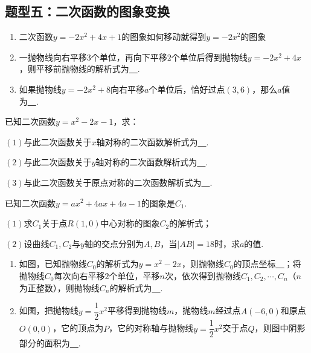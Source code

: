 \documentclass[10pt]{ctexart}
\newcommand{\abs}[1]{\left| #1 \right|}
\begin{document}
\subsection{题型五：二次函数的图象变换}
\begin{dkyi}{}{}
  \begin{enumerate}[(1)]
  \item 二次函数$y=-2x^2+4x+1$的图象如何移动就得到$y=-2x^2$的图象
  
  \item 一抛物线向右平移$3$个单位，再向下平移$2$个单位后得到抛物线$y=-2x^2+4x$，则平移前抛物线的解析式为\underline{~\hspace{1cm}~}.
  \item 如果抛物线$y=-2x^2+8$向右平移$a$个单位后，恰好过点$(3,6)$，那么$a$值为\underline{~\hspace{1cm}~}.
  \end{enumerate}
\end{dkyi}
\begin{dkyi}{}{}
已知二次函数$y=x^2-2x-1$，求：

$(1)$与此二次函数关于$x$轴对称的二次函数解析式为\underline{~\hspace{1cm}~}.

$(2)$与此二次函数关于$y$轴对称的二次函数解析式为\underline{~\hspace{1cm}~}.

$(3)$与此二次函数关于原点对称的二次函数解析式为\underline{~\hspace{1cm}~}.
\end{dkyi}
\begin{dkyi}{}{}
 已知二次函数$y=ax^2+4ax+4a-1$的图象是$C_1$.
 
 $(1)$求$C_1$关于点$R(1,0)$中心对称的图象$C_2$的解析式；
 
 $(2)$设曲线$C_1,C_2$与$y$轴的交点分别为$A,B$，当$\abs{AB}=18$时，求$a$的值.
\end{dkyi}
\begin{jply}{}{}
   \begin{enumerate}[(1)]
   \item 如图，已知抛物线$C_0$的解析式为$y=x^2-2x$，则抛物线$C_0$的顶点坐标\underline{~\hspace{1cm}~}；将抛物线$C_0$每次向右平移$2$个单位，平移$n$次，依次得到抛物线$C_1,C_2,\cdots,C_n$（$n$为正整数），则抛物线$C_n$的解析式为\underline{~\hspace{1cm}~}.
   \item 如图，把抛物线$y=\dfrac{1}{2}x^2$平移得到抛物线$m$，抛物线$m$经过点$A(-6,0)$和原点$O(0,0)$，它的顶点为$P$，它的对称轴与抛物线$y=\dfrac{1}{2}x^2$交于点$Q$，则图中阴影部分的面积为\underline{~\hspace{1cm}~}.
   \end{enumerate}
\end{jply}
\end{document}
